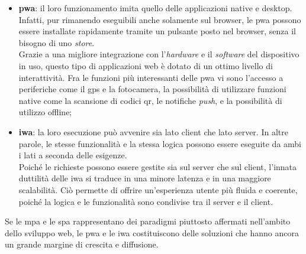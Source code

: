 \begin{itemize}
  \item \textbf{\acrfull{pwa}}: il loro funzionamento imita quello delle applicazioni native e desktop. Infatti, pur rimanendo eseguibili anche solamente sul browser, le \acrshort{pwa} possono essere installate rapidamente tramite un pulsante posto nel browser, senza il bisogno di uno \textit{store}.\\
  Grazie a una migliore integrazione con l'\textit{hardware} e il \textit{software} del dispositivo in uso, questo tipo di applicazioni web è dotato di un ottimo livello di interattività. Fra le funzioni più interessanti delle \acrshort{pwa} vi sono l'accesso a periferiche come il \acrshort{gps} e la fotocamera, la possibilità di utilizzare funzioni native come la scansione di codici \acrshort{qr}, le notifiche \textit{push}, e la possibilità di utilizzo offline;

  \item \textbf{\acrfull{iwa}}: la loro esecuzione può avvenire sia lato client che lato server. In altre parole, le stesse funzionalità e la stessa logica possono essere eseguite da ambi i lati a seconda delle esigenze.\\
  Poiché le richieste possono essere gestite sia sul server che sul client, l'innata duttilità delle \acrshort{iwa} si traduce in una minore latenza e in una maggiore scalabilità. Ciò permette di offrire un'esperienza utente più fluida e coerente, poiché la logica e le funzionalità sono condivise tra il server e il client.

  
  
  
\end{itemize}

Se le \acrshort{mpa} e le \acrshort{spa} rappresentano dei paradigmi piuttosto affermati nell'ambito dello sviluppo web, le \acrshort{pwa} e le \acrshort{iwa} costituiscono delle soluzioni che hanno ancora un grande margine di crescita e diffusione. 

